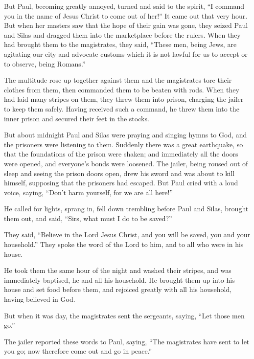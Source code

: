 But Paul, becoming greatly annoyed, turned and said to the spirit, ``I
command you in the name of Jesus Christ to come out of her!'' It came
out that very hour.  But when her masters saw that the hope
of their gain was gone, they seized Paul and Silas and dragged them into
the marketplace before the rulers.  When they had brought
them to the magistrates, they said, ``These men, being Jews, are
agitating our city  and advocate customs which it is not
lawful for us to accept or to observe, being Romans.''

 The multitude rose up together against them and the
magistrates tore their clothes from them, then commanded them to be
beaten with rods.  When they had laid many stripes on them,
they threw them into prison, charging the jailer to keep them safely.
 Having received such a command, he threw them into the
inner prison and secured their feet in the stocks.

 But about midnight Paul and Silas were praying and singing
hymns to God, and the prisoners were listening to them. 
Suddenly there was a great earthquake, so that the foundations of the
prison were shaken; and immediately all the doors were opened, and
everyone's bonds were loosened.  The jailer, being roused
out of sleep and seeing the prison doors open, drew his sword and was
about to kill himself, supposing that the prisoners had escaped.
 But Paul cried with a loud voice, saying, ``Don't harm
yourself, for we are all here!''

 He called for lights, sprang in, fell down trembling
before Paul and Silas,  brought them out, and said, ``Sirs,
what must I do to be saved?''

 They said, ``Believe in the Lord Jesus Christ, and you
will be saved, you and your household.''  They spoke the
word of the Lord to him, and to all who were in his house.

 He took them the same hour of the night and washed their
stripes, and was immediately baptised, he and all his household.
 He brought them up into his house and set food before
them, and rejoiced greatly with all his household, having believed in
God.

 But when it was day, the magistrates sent the sergeants,
saying, ``Let those men go.''

 The jailer reported these words to Paul, saying, ``The
magistrates have sent to let you go; now therefore come out and go in
peace.''


